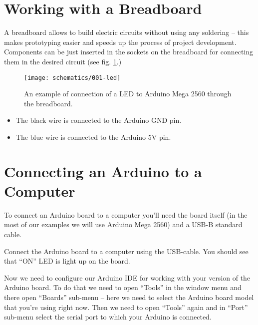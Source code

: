 \documentclass[../sparc.tex]{subfiles}
\begin{document}
\section{Working with a Breadboard}


A breadboard allows to build electric circuits without using any soldering --
this makes prototyping easier and speeds up the process of project development.
Components can be just inserted in the sockets on the breadboard for connecting
them in the desired circuit (see fig. \ref{fig:breadboard-led}.)

\begin{figure}[ht]
  \centering
  \texttt{[image: schematics/001-led]}
  \caption{An example of connection of a LED to Arduino Mega 2560 through the
    breadboard.}
  \label{fig:breadboard-led}
\end{figure}

\begin{itemize}
\item The black wire is connected to the Arduino GND pin.
\item The blue wire is connected to the Arduino 5V pin.
\end{itemize}


\section{Connecting an Arduino to a Computer}
To connect an Arduino board to a computer you'll need the board itself (in the
most of our examples we will use Arduino Mega 2560) and a USB-B standard cable.

Connect the Arduino board to a computer using the USB-cable.  You should see
that ``ON'' LED is light up on the board.

Now we need to configure our Arduino \gls{IDE} for working with your version of
the Arduino board.  To do that we need to open ``Tools'' in the window menu and
there open ``Boards'' sub-menu -- here we need to select the Arduino board model
that you're using right now.  Then we need to open ``Tools'' again and in
``Port'' sub-menu select the serial port to which your Arduino is connected.
\end{document}
